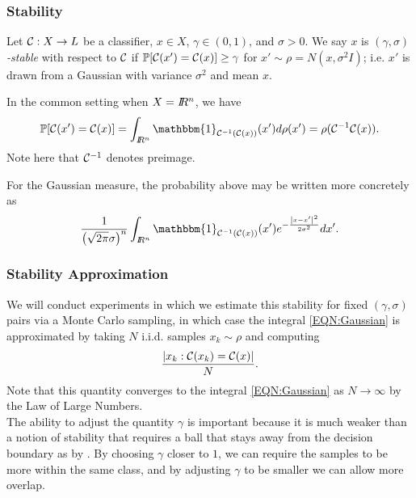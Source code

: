 \begin{frame}
  \frametitle{Stability}
\begin{definition}
Let $\mathcal{C}:X\to L$ be a classifier, $x \in X$, $\gamma\in(0,1)$, and $\sigma>0$. We say $x$ is \emph{$(\gamma,\sigma)$-stable} with respect to $\mathcal{C}$ if $\mathbb{P}[\mathcal{C}(x')=\mathcal{C}(x)] \geq \gamma$ for $x' \sim \rho = N(x, \sigma^2 I)$; i.e. $x'$ is drawn from a Gaussian with variance $\sigma^2$ and mean $x$.
\end{definition}

 In the common setting when $X=I\!\!R^n$, we have
 \[\mathbb{P}[\CC(x')=\CC(x)] = \int_{\RR^n} \mathbbm{1}_{\CC^{-1}(\CC(x))} (x') d\rho (x') = \rho(\CC^{-1}\CC(x)).\]
 Note here that $\mathcal{C}^{-1}$ denotes preimage. %

 For the Gaussian measure, the probability above may be written more concretely as
 \begin{equation}\label{EQN:Gaussian}
 \frac{1}{\left(\sqrt{2\pi}\sigma\right)^{n}} \int_{\RR^n} \mathbbm{1}_{\CC^{-1}(\CC(x))} (x')e^{-\frac{\norm{x - x'}^2}{2\sigma^2}} dx'.
 \end{equation}
\end{frame}
\begin{frame}
  \frametitle{Stability Approximation}
  We will conduct experiments in which we estimate this stability for fixed $(\gamma,\sigma)$ pairs via a Monte Carlo sampling, in which case the integral \eqref{EQN:Gaussian} is approximated by taking $N$ i.i.d. samples $x_k \sim \rho$ and computing
 \[
     \frac{\left\lvert x_k : \mathcal{C}(x_k) = \mathcal{C}(x) \right\rvert}{N}.
 \]
 Note that this quantity converges to the integral \eqref{EQN:Gaussian} as $N\to\infty$ by the Law of Large Numbers.\\

 The ability to adjust the quantity $\gamma$ is important because it is much weaker than a notion of stability that requires a ball that stays away from the decision boundary as by \citet{khoury2018}. By choosing $\gamma$ closer to $1$, we can require the samples to be more within the same class, and by adjusting $\gamma$ to be smaller we can allow more overlap.

\end{frame}
